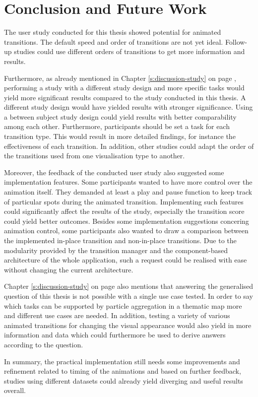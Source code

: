 \section{Conclusion and Future Work}
\label{s:outlook}


The user study conducted for this thesis showed potential for animated transitions. The default speed and order of transitions are not yet ideal. Follow-up studies could use different orders of transitions to get more information and results.

Furthermore, as already mentioned in Chapter \ref{s:discussion-study} on page \pageref{s:discussion-study}, performing a study with a different study design and more specific tasks would yield more significant results compared to the study conducted in this thesis. A different study design would have yielded results with stronger significance. Using a between subject study design could yield results with better comparability among each other. Furthermore, participants should be set a task for each transition type. This would result in more detailed findings, for instance the effectiveness of each transition. In addition, other studies could adapt the order of the transitions used from one visualisation type to another.

Moreover, the feedback of the conducted user study also suggested some implementation features. Some participants wanted to have more control over the animation itself. They demanded at least a play and pause function to keep track of particular spots during the animated transition. Implementing such features could significantly affect the results of the study, especially the transition score could yield better outcomes. Besides some implementation suggestions concering animation control, some participants also wanted to draw a comparison between the implemented in-place transition and non-in-place transitions. Due to the modularity provided by the transition manager and the component-based architecture of the whole application, such a request could be realised with ease without changing the current architecture.

Chapter \ref{s:discussion-study} on page \pageref{s:discussion-study} also mentions that answering the generalised question of this thesis is not possible with a single use case tested. In order to say which tasks can be supported by particle aggregation in a thematic map more and different use cases are needed. In addition, testing a variety of various animated transitions for changing the visual appearance would also yield in more information and data which could furthermore be used to derive answers according to the question.

In summary, the practical implementation still needs some improvements and refinement related to timing of the animations and based on further feedback, studies using different datasets could already yield diverging and useful results overall.
